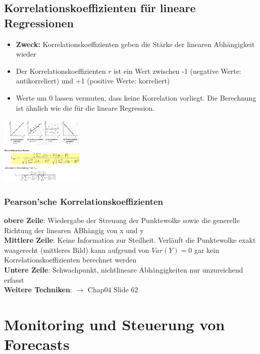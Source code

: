 \documentclass{report}
\newenvironment{Figure}
	{\par\medskip\noindent\minipage{\linewidth}}
	{\endminipage\par\medskip}
\theoremstyle{definition}
\theoremstyle{example}
\begin{document}
   \subsection{Korrelationskoeffizienten für lineare Regressionen}
\begin{itemize}
   \item \textbf{Zweck:} Korrelationskoeffizienten geben die Stärke der linearen Abhängigkeit wieder
   \item Der Korrelationskoeffizienten $r$ ist ein Wert zwischen -1 (negative Werte: antikorreliert) und +1 (positive Werte: korreliert)
   \item Werte um 0 lassen vermuten, dass keine Korrelation vorliegt. Die Berechnung ist ähnlich wie die für die lineare Regression.
\end{itemize}

\begin{Figure}
\centering
\includegraphics[width=150px]{img/Korrelationskoeffizienten.png}
	\label{fig:Korrelationskoeffizienten}
\end{Figure}

      \subsubsection{Pearson'sche Korrelationskoeffizienten}
\textbf{obere Zeile}: Wiedergabe der Streuung der Punktewolke sowie die generelle Richtung der linearen ABhängig von x und y\\
\textbf{Mittlere Zeile}: Keine Information zur Steilheit. Verläuft die Punktewolke exakt waagerecht (mittleres Bild) kann aufgrund von $Var(Y) = 0$ gar kein Korrelationskoeffizienten berechnet werden\\
\textbf{Untere Zeile}: Schwachpunkt, nichtlineare Abhängigkeiten nur unzureichend erfasst\\


\textbf{Weitere Techniken}: $\rightarrow$ Chap04 Slide 62


\section{Monitoring und Steuerung von Forecasts}
\end{document}
